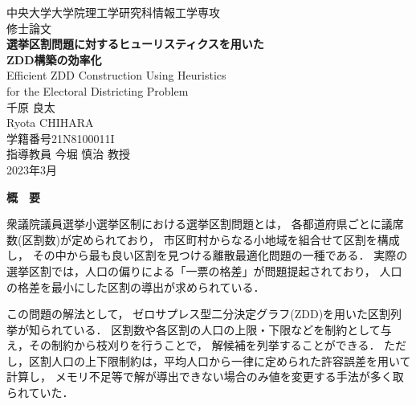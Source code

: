 ﻿\documentclass[a4j,12pt]{jreport}
\begin{document}
\thispagestyle{empty}
\begin{center}
\begin{Large}
\vspace*{0.7cm}
{\large 中央大学大学院理工学研究科情報工学専攻\\修士論文}\\
\vspace*{2.3cm}
{\bf 選挙区割問題に対するヒューリスティクスを用いた\\ZDD構築の効率化}\\
\vspace*{0.7cm}
{\sf Efficient ZDD Construction Using Heuristics \\for the Electoral Districting Problem}\\
\vspace*{5cm}
千原 良太\\
Ryota CHIHARA\\
学籍番号\hspace*{1zw}21N8100011I\\
\vspace*{2.5cm}
指導教員\hspace*{1zw} 今堀 慎治 教授\\
\vspace*{2.5cm}
2023年3月\\
\end{Large}
\end{center}


\newpage
\renewcommand{\baselinestretch}{1.25} \selectfont
{}


\begin{center} {\large \bf{概　要}} \end{center}

衆議院議員選挙小選挙区制における選挙区割問題とは，
各都道府県ごとに議席数(区割数)が定められており，
市区町村からなる小地域を組合せて区割を構成し，
その中から最も良い区割を見つける離散最適化問題の一種である．
実際の選挙区割では，人口の偏りによる「一票の格差」が問題提起されており，
人口の格差を最小にした区割の導出が求められている．

この問題の解法として，
ゼロサプレス型二分決定グラフ(ZDD)を用いた区割列挙が知られている．
区割数や各区割の人口の上限・下限などを制約として与え，その制約から枝刈りを行うことで，
解候補を列挙することができる．
ただし，区割人口の上下限制約は，平均人口から一律に定められた許容誤差を用いて計算し，
メモリ不足等で解が導出できない場合のみ値を変更する手法が多く取られていた．
\end{document}

